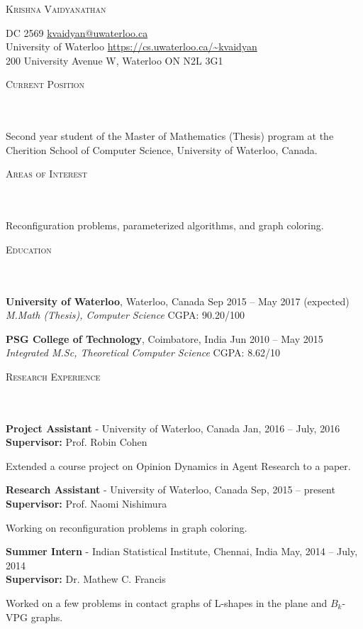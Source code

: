 \documentclass{article}
\newcommand{\header}[1]{{
\hspace*{-15pt}\vspace*{6pt} \textsc{#1}} \vspace*{-6pt} 
\lineunder
}
\newcommand{\lineunder}{
\vspace*{-8pt} \\ \hspace*{-18pt} 
\hrulefill \\
}
\newcommand{\content}{
\vspace*{2pt}%
}
\newcommand{\college}[5]{\vspace*{2pt}%
#1 \hfill #2 \\ #3 \hfill #4
\vspace*{5pt}
}
\newcommand{\employer}[4]{{
\vspace*{2pt}%
\textbf{#1} - #2 \hfill #3\\ #4 \vspace*{2pt}}
}
\renewcommand{\labelitemii}{
$\vcenter{\hbox{\tiny$\bullet$}}$\hspace*{-3pt}
}
\newenvironment{bullet-list-minor}{
\begin{list}{\labelitemii}{\setlength\leftmargin{15pt} 
\topsep 0pt \itemsep -2pt}}{\vspace*{4pt}\end{list}
}
\begin{document}
\small
\smallskip

\begin{center}
    {\large \scshape{Krishna Vaidyanathan}}
\end{center}
    DC 2569  \hfill 
    \href{mailto:kvaidyan@uwaterloo.ca}{kvaidyan@uwaterloo.ca} \\
    University of Waterloo \hfill 
    \url{https://cs.uwaterloo.ca/~kvaidyan} \\
    200 University Avenue W, Waterloo ON N2L 3G1

\vspace{15pt}
\header{Current Position}
    \content{
Second year student of the Master of Mathematics (Thesis) program at the Cherition School of Computer
Science, University of Waterloo, Canada.}

\vspace*{4pt}%
\header{Areas of Interest}
Reconfiguration problems, parameterized algorithms, and graph coloring. 

\vspace*{4pt}%
\header{Education}
    \college{\textbf{University of Waterloo}, Waterloo, Canada}{Sep 2015 -- May 2017 (expected)}
    {\textit{M.Math (Thesis), Computer Science}}{CGPA: 90.20/100}\\

    \college{\textbf{PSG College of Technology}, Coimbatore, India}{Jun 2010 -- May 2015}
    {\textit{Integrated M.Sc, Theoretical Computer Science}}{CGPA: 8.62/10}\\

\vspace*{4pt}%
\header{Research Experience}
\employer{Project Assistant}{University of Waterloo, Canada}{Jan, 2016 -- July,
    2016}{\textbf{Supervisor:} Prof. Robin Cohen}
\begin{bullet-list-minor}
\item Extended a course project on Opinion Dynamics in Agent Research to a
    paper.
\end{bullet-list-minor}

  \employer{Research Assistant}{University of Waterloo, Canada}{Sep, 2015 --
      present}{\textbf{Supervisor:} Prof. Naomi Nishimura}
\begin{bullet-list-minor}
\item Working on reconfiguration problems in graph coloring. 
\end{bullet-list-minor}

\employer{Summer Intern}{Indian Statistical Institute,
    Chennai, India}{May, 2014 -- July, 2014}{\textbf{Supervisor:} Dr. Mathew C. Francis}
\begin{bullet-list-minor}
\item Worked on a few problems in contact graphs of L-shapes in the plane and $B_{k}$-VPG graphs.
\end{bullet-list-minor}
\end{document}
